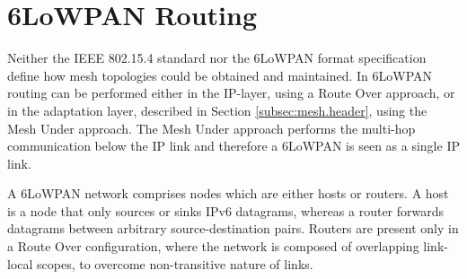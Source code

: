 \chapter{6LoWPAN Routing}\label{ch:routing}
Neither the IEEE 802.15.4 \cite{ieee802.15.4} standard nor the 6LoWPAN format specification \cite{rfc4944} define how mesh topologies could be obtained and maintained. In 6LoWPAN routing can be performed either in the IP-layer, using a Route Over approach, or in the adaptation layer, described in Section \ref{subsec:mesh.header}, using the Mesh Under approach. The Mesh Under approach performs the multi-hop communication below the IP link and therefore a 6LoWPAN is seen as a single IP link. 

A 6LoWPAN network comprises nodes which are either hosts or routers. A host is a node that only sources or sinks IPv6 datagrams, whereas a router forwards datagrams between arbitrary source-destination pairs. Routers are present only in a Route Over configuration, where the network is composed of overlapping link-local scopes, to overcome non-transitive nature of links. 
